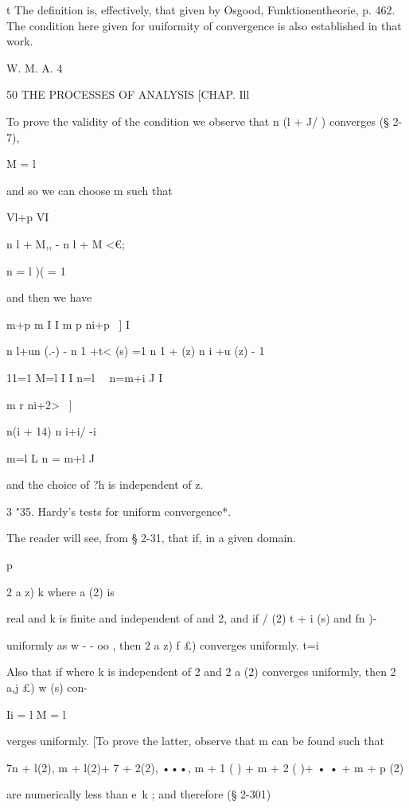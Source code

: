 t The definition is, effectively, that given by Osgood, Funktionentheorie, p. 462. The 
condition here given for uuiformity of convergence is also established in that work. 

W. M. A. 4 



50 THE PROCESSES OF ANALYSIS [CHAP. Ill 

To prove the validity of the condition we observe that n (l + J/ ) converges (§ 2-7), 

M = l 

and so we can choose m such that 

Vl+p VI 

n  l + M,, - n  l + M  <€; 

n = l )( = 1 

and then we have 

m+p m I I m p ni+p ~] I 

n  l+un (.-)  - n  1 +t<  (s)  =1 n  1 +   (z)  n  i +u  (z)  - 1 

11=1 M=l I I n=l \ \  n=m+i J I 

m r ni+2> ~] 

 n(i + 14) n  i+i/  -i 

m=l L n = m+l J 

and the choice of ?h is independent of z. 

3 "35. Hardy's tests for uniform convergence*. 



The reader will see, from § 2-31, that if, in a given domain. 



p 



2 a   z)   k where a  (2) is 



real and k is finite and independent of   and 2, and if / (2)   t + i (s) and fn  )-  

uniformly as w - - oo , then 2 a   z) f   £) converges uniformly. 
 t=i 

Also that if 
where k is independent of 2 and 2 a  (2) converges uniformly, then 2 a,j  £) w  (s) con- 

Ii = l M = l 

verges uniformly. [To prove the latter, observe that m can be found such that 

 7n + l(2),  m + l(2)+ 7  + 2(2), •••,  m + 1 ( ) +  m + 2 ( )+ • •   +  m + p (2) 

are numerically less than e\ k ; and therefore (§ 2-301) 

